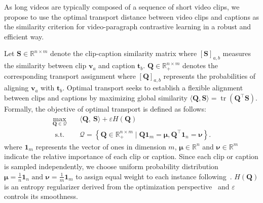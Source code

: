 As long videos are typically composed of a sequence of short video clips, we propose to use the optimal transport distance between video clips and captions as the similarity criterion for video-paragraph contrastive learning in a robust and efficient way. 

Let $\mathbf{S} \in \mathbb{R}^{n\times m}$ denote the clip-caption similarity matrix where $[\mathbf{S}]_{a,b}$ measures the similarity between clip $\textbf{v}_a$ and caption $\textbf{t}_b$. $\mathbf{Q}\in \mathbb{R}_{+}^{n\times m}$ denotes the corresponding  transport assignment where $[\mathbf{Q}]_{a,b}$ represents the probabilities of aligning $\textbf{v}_a$ with $\textbf{t}_b$.
Optimal transport seeks to establish a flexible alignment between clips and captions by maximizing global similarity $\langle \mathbf{Q}, \mathbf{S}\rangle=\operatorname{tr}(\mathbf{Q}^\top\mathbf{S})$.
Formally, the objective of optimal transport is defined as follows:
\begin{equation}
  \begin{aligned}
 \max _{\mathbf{Q} \in \mathcal{Q}} & \quad 
 \langle\mathbf{Q},~ \mathbf{S}\rangle +\varepsilon H(\mathbf{Q})\\
\text { s.t. } &  
\quad 
\mathcal{Q}=\left\{\mathbf{Q} \in \mathbb{R}_{+}^{n \times m} \mid \mathbf{Q} \mathbf{1}_m=\boldsymbol{\mu}, \mathbf{Q}^{\top} \mathbf{1}_n= \boldsymbol{\nu} \right\}.
\end{aligned}
\label{eq:ot}
\end{equation}
where $\mathbf{1}_m$ represents the vector of ones in dimension $m$, $\boldsymbol{\mu}\in \mathbb{R}^{n}$ and $\boldsymbol{\nu}\in \mathbb{R}^{m}$ indicate the relative importance of each clip or caption. Since each clip or caption is sampled independently, we choose uniform probability distribution $\boldsymbol{\mu}=\frac{1}{n} \mathbf{1}_n \text { and } \boldsymbol{\nu}=\frac{1}{m} \mathbf{1}_m$ to assign equal weight to each instance following~\cite{su2017order}.
$H(\mathbf{Q})$ is an entropy regularizer derived from the optimization perspective~\citep{sinkhorn} and $\varepsilon$ controls its smoothness. 

